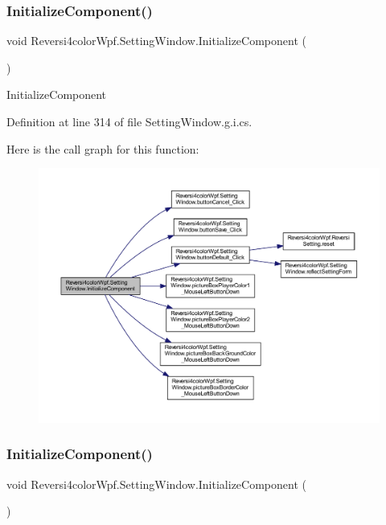 \subsubsection{\texorpdfstring{Initialize\+Component()}{InitializeComponent()}\hspace{0.1cm}{\footnotesize\ttfamily [1/4]}}
{\footnotesize\ttfamily void Reversi4color\+Wpf.\+Setting\+Window.\+Initialize\+Component (\begin{DoxyParamCaption}{ }\end{DoxyParamCaption})}



Initialize\+Component 



Definition at line 314 of file Setting\+Window.\+g.\+i.\+cs.

Here is the call graph for this function\+:
\nopagebreak
\begin{figure}[H]
\begin{center}
\leavevmode
\includegraphics[width=350pt]{class_reversi4color_wpf_1_1_setting_window_ac85da370c146e04c94ae2535845b603f_cgraph}
\end{center}
\end{figure}
\mbox{\label{class_reversi4color_wpf_1_1_setting_window_ac85da370c146e04c94ae2535845b603f}} 
\subsubsection{\texorpdfstring{Initialize\+Component()}{InitializeComponent()}\hspace{0.1cm}{\footnotesize\ttfamily [2/4]}}
{\footnotesize\ttfamily void Reversi4color\+Wpf.\+Setting\+Window.\+Initialize\+Component (\begin{DoxyParamCaption}{ }\end{DoxyParamCaption})}



